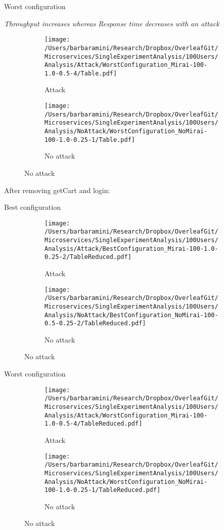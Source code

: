 \documentclass[10pt]{article}
\begin{document}
\break
Worst configuration \par
\textit{Throughput increases whereas Response time decreases with an attack}
\begin{figure}[h]
\begin{subfigure}{.5\textwidth}
\texttt{[image: /Users/barbaramini/Research/Dropbox/OverleafGit/Microservices/SingleExperimentAnalysis/100Users/Analysis/Attack/WorstConfiguration\_Mirai-100-1.0-0.5-4/Table.pdf]}
\caption{Attack}
\end{subfigure}
\begin{subfigure}{.5\textwidth}
\texttt{[image: /Users/barbaramini/Research/Dropbox/OverleafGit/Microservices/SingleExperimentAnalysis/100Users/Analysis/NoAttack/WorstConfiguration\_NoMirai-100-1.0-0.25-1/Table.pdf]}
\caption{No attack}
\end{subfigure}
\end{figure}

\break
After removing  getCart and login:\par
Best configuration\par
\begin{figure}[h]
\begin{subfigure}{.5\textwidth}
\texttt{[image: /Users/barbaramini/Research/Dropbox/OverleafGit/Microservices/SingleExperimentAnalysis/100Users/Analysis/Attack/BestConfiguration\_Mirai-100-1.0-0.25-2/TableReduced.pdf]}
\caption{Attack}
\end{subfigure}
\begin{subfigure}{.5\textwidth}
\texttt{[image: /Users/barbaramini/Research/Dropbox/OverleafGit/Microservices/SingleExperimentAnalysis/100Users/Analysis/NoAttack/BestConfiguration\_NoMirai-100-0.5-0.25-2/TableReduced.pdf]}
\caption{No attack}
\end{subfigure}
\end{figure}
\break
Worst configuration \par
\begin{figure}[h]
\begin{subfigure}{.5\textwidth}
\texttt{[image: /Users/barbaramini/Research/Dropbox/OverleafGit/Microservices/SingleExperimentAnalysis/100Users/Analysis/Attack/WorstConfiguration\_Mirai-100-1.0-0.5-4/TableReduced.pdf]}
\caption{Attack}
\end{subfigure}
\begin{subfigure}{.5\textwidth}
\texttt{[image: /Users/barbaramini/Research/Dropbox/OverleafGit/Microservices/SingleExperimentAnalysis/100Users/Analysis/NoAttack/WorstConfiguration\_NoMirai-100-1.0-0.25-1/TableReduced.pdf]}
\caption{No attack}
\end{subfigure}
\end{figure}
\end{document}
